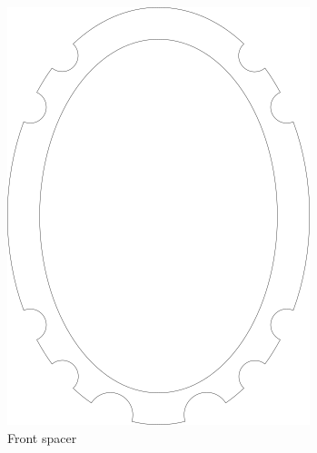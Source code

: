 \documentclass{article}
\begin{document}
\begin{figure}
\begin{subfigure}[b]{0.24\textwidth}
        \includegraphics[width=\textwidth]{images/spacer_front.png}
        \caption{Front spacer}
        \label{f:driver:spacer_front}
    \end{subfigure}
    \begin{subfigure}[b]{0.24\textwidth}

\end{subfigure}
\end{figure}
\end{document}
